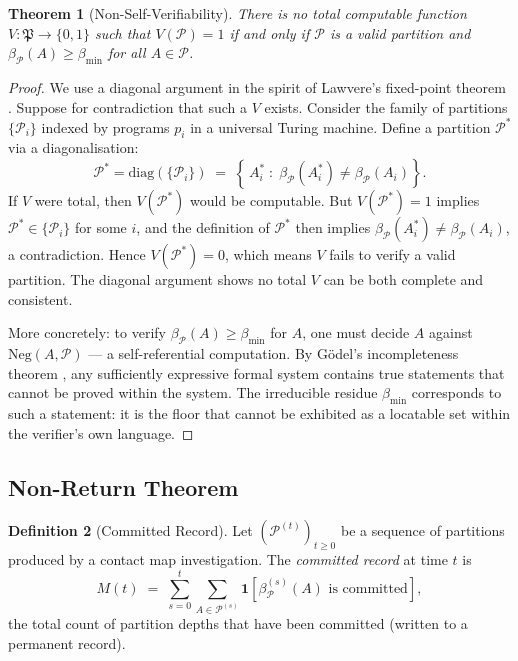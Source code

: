 \documentclass[12pt,a4paper,twocolumn]{article}
\theoremstyle{plain}
\newtheorem{theorem}{Theorem}[section]
\theoremstyle{definition}
\newtheorem{definition}[theorem]{Definition}
\theoremstyle{remark}
\newcommand{\Part}{\mathcal{P}}
\newcommand{\bmin}{\beta_{\min}}
\newcommand{\bP}{\beta_{\mathcal{P}}}
\newcommand{\Neg}{\mathrm{Neg}}
\begin{document}
\begin{theorem}[Non-Self-Verifiability]
\label{thm:non-self-verify}
There is no total computable function $V : \mathfrak{P} \to \{0,1\}$ such
that $V(\Part) = 1$ if and only if $\Part$ is a valid partition and $\bP(A)
\geq \bmin$ for all $A \in \Part$.
\end{theorem}

\begin{proof}
We use a diagonal argument in the spirit of Lawvere's fixed-point theorem
\citep{lawvere1969diagonal}.  Suppose for contradiction that such a $V$
exists.  Consider the family of partitions $\{\Part_i\}$ indexed by programs
$p_i$ in a universal Turing machine.  Define a partition $\Part^*$ via a
diagonalisation:
\begin{equation}
  \Part^* = \mathrm{diag}\!\left(\{\Part_i\}\right)
    \;=\; \left\{\, A_i^* \;:\; \bP(A_i^*) \neq \bP(A_i)\right\}.
\end{equation}
If $V$ were total, then $V(\Part^*)$ would be computable.  But $V(\Part^*)
= 1$ implies $\Part^* \in \{\Part_i\}$ for some $i$, and the definition of
$\Part^*$ then implies $\bP(A_i^*) \neq \bP(A_i)$, a contradiction.  Hence
$V(\Part^*) = 0$, which means $V$ fails to verify a valid partition.  The
diagonal argument shows no total $V$ can be both complete and consistent.

More concretely: to verify $\bP(A) \geq \bmin$ for $A$, one must decide $A$
against $\Neg(A,\Part)$ --- a self-referential computation.  By
G\"odel's incompleteness theorem \citep{godel1931formal}, any sufficiently
expressive formal system contains true statements that cannot be proved within
the system.  The irreducible residue $\bmin$ corresponds to such a statement:
it is the floor that cannot be exhibited as a locatable set within the
verifier's own language.
\end{proof}

\subsection{Non-Return Theorem}

\begin{definition}[Committed Record]
\label{def:committed-record}
Let $(\Part^{(t)})_{t \geq 0}$ be a sequence of partitions produced by a
contact map investigation.  The \emph{committed record} at time $t$ is
\begin{equation}
  M(t) \;=\; \sum_{s=0}^{t} \sum_{A \in \Part^{(s)}} \mathbf{1}[\bP^{(s)}(A)
    \text{ is committed}],
\end{equation}
the total count of partition depths that have been committed (written to a
permanent record).
\end{definition}
\end{document}
